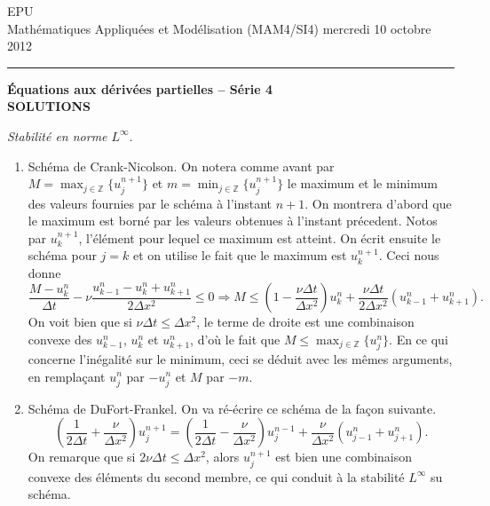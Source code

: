 \documentclass[12pt,a4paper]{article}
\begin{document}
 \hfill EPU\\
\noindent Math\'ematiques Appliqu\'ees et Mod\'elisation (MAM4/SI4) \hfill mercredi 10 octobre 2012 \\

\hrule

\bigskip
\bigskip

\begin{center}{\bf \'Equations aux d\'eriv\'ees partielles --
S\'erie 4 \\
SOLUTIONS}\end{center}

\bigskip

\parskip 12pt
{\it Stabilit\'e en norme $L^{\infty}$}.
\begin{enumerate}
\item Sch\'ema de Crank-Nicolson. On notera comme avant par
  $M=\max_{j\in\mathbb{Z}}\{u_j^{n+1}\}$ et
  $m=\min_{j\in\mathbb{Z}}\{u_j^{n+1}\}$ le maximum et le minimum des
  valeurs fournies par le sch\'ema \`a l'instant $n+1$. On montrera
  d'abord que le maximum est born\'e par les valeurs obtenues \`a
  l'instant pr\'ecedent. Notos par
  $u_k^{n+1}$, l'\'el\'ement pour lequel ce maximum est atteint. On
  \'ecrit ensuite le  sch\'ema pour $j=k$ et on utilise le fait que
  le maximum est $u_k^{n+1}$. Ceci nous donne
$$
\frac{M-u_k^n}{\Delta t}-\nu\frac{u_{k-1}^n-u_k^n+u_{k+1}^n}{2\Delta
  x^2} \le 0 \Rightarrow M\le \left(1-\frac{\nu\Delta t}{\Delta
    x^2}\right)u_k^n +\frac{\nu\Delta t}{2\Delta
    x^2} (u_{k-1}^n+u_{k+1}^n).
$$
On voit bien que si $\nu\Delta t\le \Delta x^2$, le terme de droite
est une combinaison convexe des $u^n_{k-1}$, $u^n_k$ et $u^n_{k+1}$,
d'o\`u le fait que $M\le \max_{j\in \mathbb{Z}}\{u_j^n\}$. En ce qui
concerne l'in\'egalit\'e sur le minimum, ceci se d\'eduit avec les
m\^emes arguments, en rempla\c{c}ant $u^n_j$ par $-u_j^n$ et $M$ par $-m$. 
\item Sch\'ema de DuFort-Frankel. On va r\'e-\'ecrire ce sch\'ema de
  la fa\c{c}on suivante.
$$
\left(\frac{1}{2\Delta t}+\frac{\nu}{\Delta
    x^2}\right)u_j^{n+1}=\left(\frac{1}{2\Delta t}-\frac{\nu}{\Delta
    x^2}\right) u_j^{n-1}+\frac{\nu}{\Delta x^2}(u^n_{j-1}+u^n_{j+1}).
$$
On remarque que si $2\nu\Delta t\le \Delta x^2$, alors $u_j^{n+1}$ est
bien une combinaison convexe des \'el\'ements du second membre, ce qui
conduit \`a la stabilit\'e $L^\infty$ su sch\'ema.
\end{enumerate}
\end{document}
